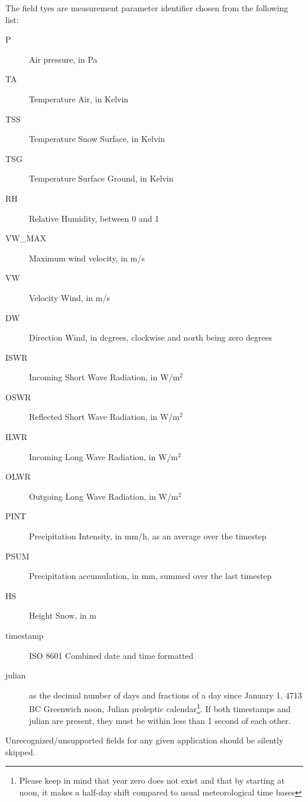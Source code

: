 \documentclass[a4paper,10pt]{article}
\begin{document}
The field tyes are measurement parameter identifier chosen from the following list: %
\begin{description}
	\item[P] Air pressure, in Pa
	\item[TA] Temperature Air, in Kelvin
	\item[TSS] Temperature Snow Surface, in Kelvin
	\item[TSG] Temperature Surface Ground, in Kelvin
	\item[RH] Relative Humidity, between 0 and 1
	\item[VW\_MAX] Maximum wind velocity, in m/s
	\item[VW] Velocity Wind, in m/s
	\item[DW] Direction Wind, in degrees, clockwise and north being zero degrees
	\item[ISWR] Incoming Short Wave Radiation, in W/m$^2$
	\item[OSWR] Reflected Short Wave Radiation, in W/m$^2$
	\item[ILWR] Incoming Long Wave Radiation, in W/m$^2$
	\item[OLWR] Outgoing Long Wave Radiation, in W/m$^2$
	\item[PINT] Precipitation Intensity, in mm/h, as an average over the timestep
	\item[PSUM] Precipitation accumulation, in mm, summed over the last timestep
	\item[HS] Height Snow, in m
	\item[timestamp] ISO 8601 Combined date and time formatted
	\item[julian] as the decimal number of days and fractions of a day since January 1, 4713 BC Greenwich noon, Julian proleptic calendar\footnote{Please keep in mind that year zero does not exist and that by starting at noon, it makes a half-day shift compared to usual meteorological time bases}. If both timestamps and julian are present, they must be within less than 1 second of each other.
\end{description}
Unrecognized/unsupported fields for any given application should be silently skipped.
\end{document}
